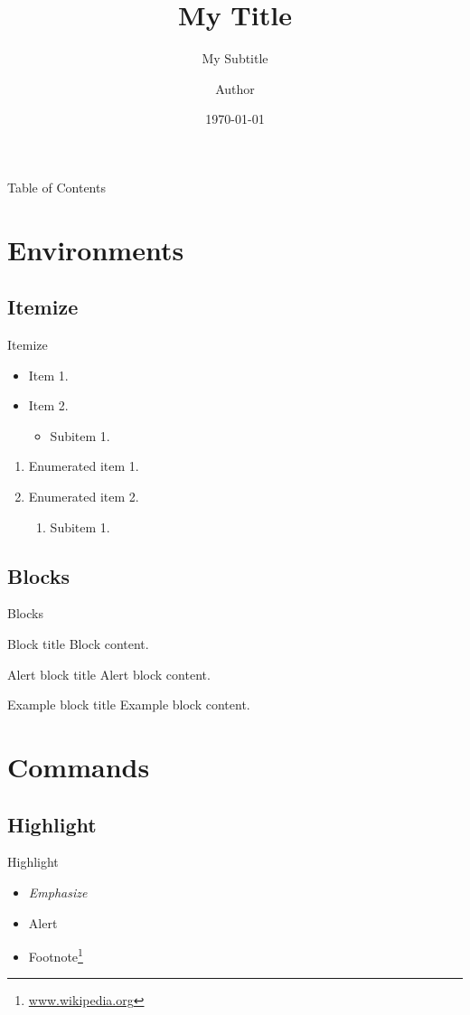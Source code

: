 \documentclass[11pt, compress, aspectratio=169]{beamer}
\title{My Title}
\subtitle{My Subtitle}
\author[Short Author]{%
  Author\\[2pt]
  \usebeamerfont{institute} \mail{e-mail@domain.edu}
}
\institute{Institute}
\date{\today}
\begin{document}
  \begin{frame}[plain]
    \titlepage
  \end{frame}

  \begin{frame}{Table of Contents}
    \tableofcontents
  \end{frame}

  \section{Environments}
  \subsection{Itemize}
  \begin{frame}{Itemize}
    \begin{itemize}
      \item Item 1.
      \item Item 2.
        \begin{itemize}
          \item Subitem 1.
        \end{itemize}
    \end{itemize}
    \vfill
    \begin{enumerate}
      \item Enumerated item 1.
      \item Enumerated item 2.
        \begin{enumerate}
          \item Subitem 1.
        \end{enumerate}
    \end{enumerate}
  \end{frame}

  \subsection{Blocks}
  \begin{frame}{Blocks}
    \begin{block}{Block title}
      Block content.
    \end{block}
    \begin{alertblock}{Alert block title}
      Alert block content.
    \end{alertblock}
    \begin{exampleblock}{Example block title}
      Example block content.
    \end{exampleblock}
  \end{frame}

  \section{Commands}
  \subsection{Highlight}
  \begin{frame}{Highlight}
    \begin{itemize}
      \item \emph{Emphasize}
      \item \alert{Alert}
      \item Footnote\footnote{\url{www.wikipedia.org}}
    \end{itemize}
  \end{frame}
\end{document}
